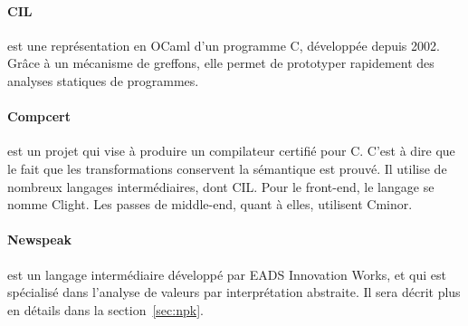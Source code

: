 \paragraph{CIL}\cite{NeculaCil}  est une représentation en
OCaml d'un programme C, développée depuis 2002. Grâce à un mécanisme de
greffons, elle permet de prototyper rapidement des analyses statiques de
programmes.

\paragraph{Compcert} est un projet qui vise à produire un compilateur certifié
pour C. C'est à dire que le fait que les transformations conservent la
sémantique est prouvé. Il utilise de nombreux langages intermédiaires, dont CIL.
Pour le front-end, le langage se nomme Clight\cite{cfront}. Les passes de
middle-end, quant à elles, utilisent Cminor\cite{cminorSL}.

\paragraph{Newspeak}\cite{newspeak} est un langage intermédiaire développé par
EADS Innovation Works, et qui est spécialisé dans l'analyse de valeurs par
interprétation abstraite. Il sera décrit plus en détails dans la
section~\ref{sec:npk}.

